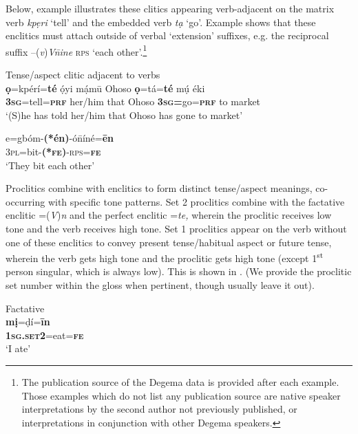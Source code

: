 \documentclass[output=paper]{langsci/langscibook}
\begin{document}
Below, example  illustrates these clitics appearing verb-adjacent on the matrix verb \textit{kpẹri} ‘tell’ and the embedded verb \textit{tạ} ‘go’. Example  shows that these enclitics must attach outside of verbal ‘extension’ suffixes, e.g. the reciprocal suffix –(\textit{v})\textit{V\={n}ine} \textsc{rps} ‘each other’.\footnote{The publication source of the Degema data is provided after each example. Those examples which do not list any publication source are native speaker interpretations by the second author not previously published, or interpretations in conjunction with other Degema speakers. 
}





\ea\label{bkm:Ref406316661}
{Tense/aspect clitic adjacent to verbs}\\
\gll   \textbf{ọ}=kpérí=\textbf{té}   ọ́yi     mạ́mū   Ohoso   \textbf{ọ}=tá=\textbf{té}     mụ́  éki\\
      \textbf{3}\textbf{\textsc{sg}}=tell=\textbf{\textsc{prf}}   her/him  that     Ohoso  \textbf{3}\textbf{\textsc{sg}}\textbf{=}go=\textbf{\textsc{prf}}  to  market\\
\glt   ‘(S)he has told her/him that Ohoso has gone to market’ \citep[63]{Kari2004}
\z


\ea
\gll   e=gbóm-\textbf{(*én)}{}-ó\={n}íné=\textbf{ēn}\\
       3\textsc{pl}=bit-\textbf{(*}\textbf{\textsc{fe}}\textbf{)}{}-\textsc{rps}=\textbf{\textsc{fe}}\\
\glt   ‘They bit each other’ \citep[149]{Kari2004}
\z

Proclitics combine with enclitics to form distinct tense/aspect meanings, co-occurring with specific tone patterns. Set 2 proclitics combine with the factative enclitic =(\textit{V})\textit{n} and the perfect enclitic =\textit{te,} wherein the proclitic receives low tone and the verb receives high tone. Set 1 proclitics appear on the verb without one of these enclitics to convey present tense/habitual aspect or future tense, wherein the verb gets high tone and the proclitic gets high tone (except 1\textsuperscript{st} person singular, which is always low). This is shown in . (We provide the proclitic set number within the gloss when pertinent, though usually leave it out).


\ea
Factative\\
\gll  \textbf{mị}=ḍí=\textbf{īn}\\
     \textbf{\textsc{1sg.set2}}=eat=\textbf{\textsc{fe}}\\
\glt ‘I ate’ \citep[44]{Kari1997}
\z
\end{document}
